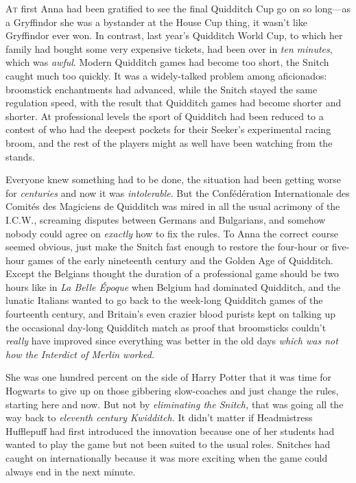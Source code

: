 
\lettrine{A}{t} first Anna had been gratified to see the final Quidditch Cup go on so long—as a Gryffindor she was a bystander at the House Cup thing, it wasn't like Gryffindor ever won. In contrast, last year's Quidditch World Cup, to which her family had bought some very expensive tickets, had been over in \emph{ten minutes}, which was \emph{awful}. Modern Quidditch games had become too short, the Snitch caught much too quickly. It was a widely-talked problem among aficionados: broomstick enchantments had advanced, while the Snitch stayed the same regulation speed, with the result that Quidditch games had become shorter and shorter. At professional levels the sport of Quidditch had been reduced to a contest of who had the deepest pockets for their Seeker's experimental racing broom, and the rest of the players might as well have been watching from the stands.

Everyone knew something had to be done, the situation had been getting worse for \emph{centuries} and now it was \emph{intolerable}. But the Confédération Internationale des Comités des Magiciens de Quidditch was mired in all the usual acrimony of the I.C.W., screaming disputes between Germans and Bulgarians, and somehow nobody could agree on \emph{exactly} how to fix the rules. To Anna the correct course seemed obvious, just make the Snitch fast enough to restore the four-hour or five-hour games of the early nineteenth century and the Golden Age of Quidditch. Except the Belgians thought the duration of a professional game should be two hours like in \emph{La Belle Époque} when Belgium had dominated Quidditch, and the lunatic Italians wanted to go back to the week-long Quidditch games of the fourteenth century, and Britain's even crazier blood purists kept on talking up the occasional day-long Quidditch match as proof that broomsticks couldn't \emph{really} have improved since everything was better in the old days \emph{which was not how the Interdict of Merlin worked.}

She was one hundred percent on the side of Harry Potter that it was time for Hogwarts to give up on those gibbering slow-coaches and just change the rules, starting here and now. But not by \emph{eliminating the Snitch,} that was going all the way back to \emph{eleventh century Kwidditch.} It didn't matter if Headmistress Hufflepuff had first introduced the innovation because one of her students had wanted to play the game but not been suited to the usual roles. Snitches had caught on internationally because it was more exciting when the game could always end in the next minute.

